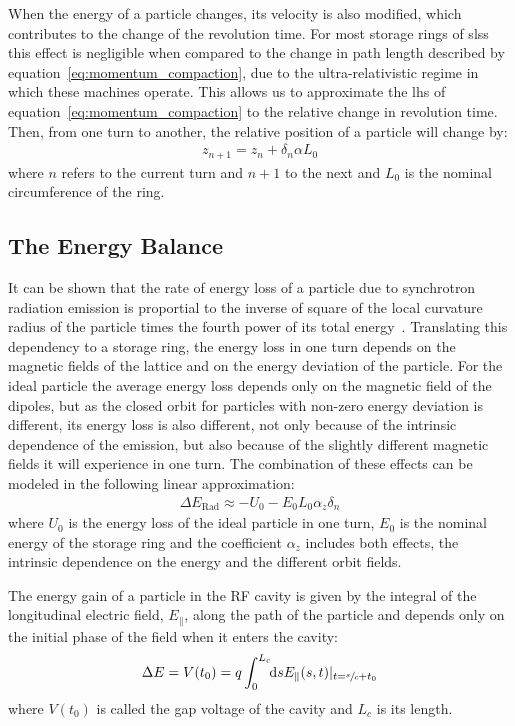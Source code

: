     When the energy of a particle changes, its velocity is also modified, which contributes to the change of the revolution time. For most storage rings of \gls{sls}s this effect is negligible when compared to the change in path length described by equation~\eqref{eq:momentum_compaction}, due to the ultra-relativistic regime in which these machines operate. This allows us to approximate the \gls{lhs} of equation~\eqref{eq:momentum_compaction} to the relative change in revolution time. Then, from one turn to another, the relative position of a particle will change by:
	\begin{align}\label{eq:revolution_time_variation}
		z_{n+1} = z_n + \delta_n\alpha L_0
	\end{align}
	where $n$ refers to the current turn and $n+1$ to the next and $L_0$ is the nominal circumference of the ring.

\subsection{The Energy Balance}

	It can be shown that the rate of energy loss of a particle due to synchrotron radiation emission is proportial to the inverse of square of the local curvature radius of the particle times the fourth power of its total energy~\cite[pp. 661: eq. 14.31]{Jackson1975}. Translating this dependency to a storage ring, the energy loss in one turn depends on the magnetic fields of the lattice and on the energy deviation of the particle. For the ideal particle the average energy loss depends only on the magnetic field of the dipoles, but as the closed orbit for particles with non-zero energy deviation is different, its energy loss is also different, not only because of the intrinsic dependence of the emission, but also because of the slightly different magnetic fields it will experience in one turn. The combination of these effects can be modeled in the following linear approximation:
	\begin{align}\label{eq:radiation_loss}
		\Delta E_\text{Rad} \approx -U_0 - E_0L_0\alpha_z\delta_n
	\end{align}
	where $U_0$ is the energy loss of the ideal particle in one turn, $E_0$ is the nominal energy of the storage ring and the coefficient $\alpha_z$ includes both effects, the intrinsic dependence on the energy and the different orbit fields.

	The energy gain of a particle in the RF cavity is given by the integral of the longitudinal electric field, $E_\parallel$, along the path of the particle and depends only on the initial phase of the field when it enters the cavity:
	\begin{align}
		\Delta E = V(t_0) = q\defint{s}{E_\parallel(s,t)|_{t=\sfrac{s}{c}+t_0}}{0}{L_c}
	\end{align}
	where $V(t_0)$ is called the gap voltage of the cavity and $L_c$ is its length.

